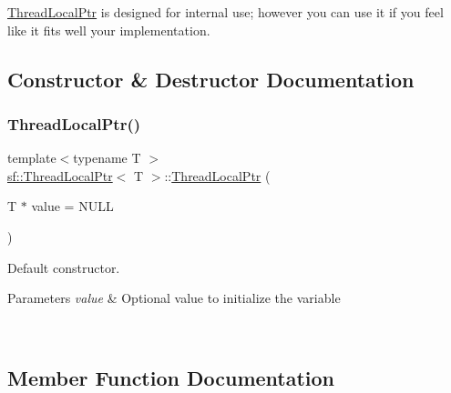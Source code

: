 \mbox{\hyperlink{classsf_1_1_thread_local_ptr}{Thread\+Local\+Ptr}} is designed for internal use; however you can use it if you feel like it fits well your implementation. \begin{DoxyVerb}\end{DoxyVerb}
 

\subsection{Constructor \& Destructor Documentation}
\mbox{\label{classsf_1_1_thread_local_ptr_a8c678211d7828d2a8c41cb534422d649}} 
\subsubsection{\texorpdfstring{ThreadLocalPtr()}{ThreadLocalPtr()}}
{\footnotesize\ttfamily template$<$typename T $>$ \\
\mbox{\hyperlink{classsf_1_1_thread_local_ptr}{sf\+::\+Thread\+Local\+Ptr}}$<$ T $>$\+::\mbox{\hyperlink{classsf_1_1_thread_local_ptr}{Thread\+Local\+Ptr}} (\begin{DoxyParamCaption}\item[{T $\ast$}]{value = {\ttfamily NULL} }\end{DoxyParamCaption})}



Default constructor. 


\begin{DoxyParams}{Parameters}
{\em value} & Optional value to initialize the variable \begin{DoxyVerb}\end{DoxyVerb}
 \\
\hline
\end{DoxyParams}


\subsection{Member Function Documentation}
\mbox{\label{classsf_1_1_thread_local_ptr_a81ca089ae5cda72c7470ca93041c3cb2}} 
